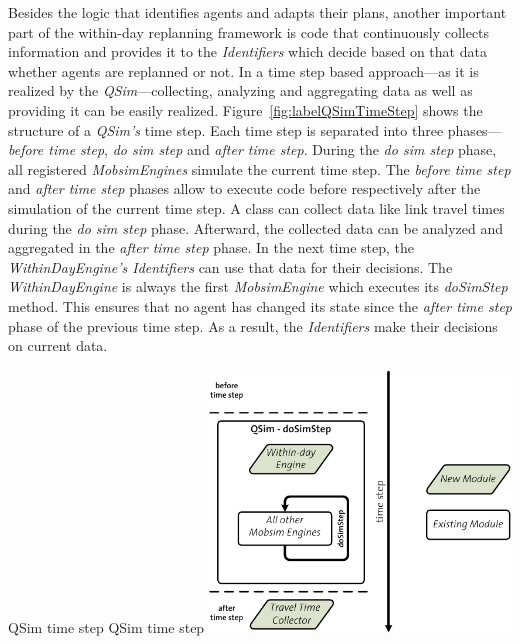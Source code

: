 Besides the logic that identifies agents and adapts their plans, another important part of the within-day replanning framework is code that continuously collects information and provides it to the \emph{Identifiers} which decide based on that data whether agents are replanned or not. In a time step based approach---as it is realized by the \emph{QSim}---collecting, analyzing and aggregating data as well as providing it can be easily realized. Figure~\ref{fig:labelQSimTimeStep} shows the structure of a \emph{QSim's} time step. Each time step is separated into three phases---\emph{before time step}, \emph{do sim step} and \emph{after time step}. During the \emph{do sim step} phase, all registered \emph{MobsimEngines} simulate the current time step. The \emph{before time step} and \emph{after time step} phases allow to execute code before respectively after the simulation of the current time step. A class can collect data like link travel times during the \emph{do sim step} phase. Afterward, the collected data can be analyzed and aggregated in the \emph{after time step} phase. In the next time step, the \emph{WithinDayEngine's Identifiers} can use that data for their decisions. The \emph{WithinDayEngine} is always the first \emph{MobsimEngine} which executes its \emph{doSimStep} method. This ensures that no agent has changed its state since the \emph{after time step} phase of the previous time step. As a result, the \emph{Identifiers} make their decisions on %
current data.

\createfigure%
{QSim time step}%
{QSim time step}%
{\label{fig:labelQSimTimeStep}}%
{\includegraphics[width=8.0cm, angle=0]{extending/figures/WithinDayReplanning/QSimTimeStep}}%
{}


